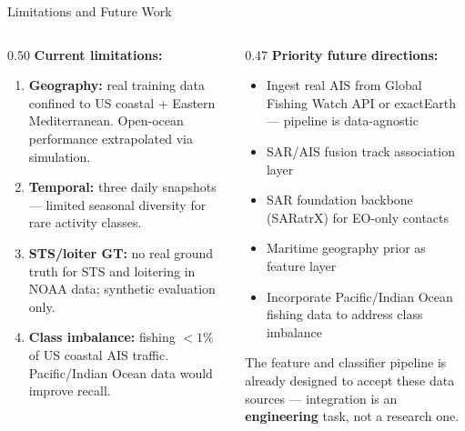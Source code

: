 \documentclass[aspectratio=169,10pt]{beamer}
\begin{document}
\begin{frame}{Limitations and Future Work}
  \begin{columns}[T]
    \begin{column}{0.50\textwidth}
      \textbf{Current limitations:}
      \begin{enumerate}
        \item \textbf{Geography:} real training data confined to US
              coastal + Eastern Mediterranean. Open-ocean performance
              extrapolated via simulation.
        \item \textbf{Temporal:} three daily snapshots — limited
              seasonal diversity for rare activity classes.
        \item \textbf{STS/loiter GT:} no real ground truth for
              STS and loitering in NOAA data; synthetic evaluation only.
        \item \textbf{Class imbalance:} fishing $<1\%$ of US coastal
              AIS traffic. Pacific/Indian Ocean data would improve recall.
      \end{enumerate}
    \end{column}
    \begin{column}{0.47\textwidth}
      \textbf{Priority future directions:}
      \begin{itemize}
        \item Ingest real AIS from Global Fishing Watch API or
              exactEarth — pipeline is data-agnostic
        \item SAR/AIS fusion track association layer
        \item SAR foundation backbone (SARatrX) for EO-only contacts
        \item Maritime geography prior as feature layer
        \item Incorporate Pacific/Indian Ocean fishing data to address
              class imbalance
      \end{itemize}

      \bigskip
      The feature and classifier pipeline is already designed to accept
      these data sources — integration is an \textbf{engineering} task,
      not a research one.
    \end{column}
  \end{columns}
\end{frame}
\end{document}
